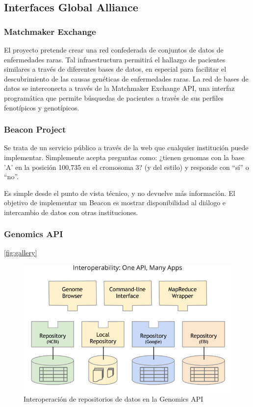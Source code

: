 \documentclass[
10pt, %
letterpaper, %
oneside, %
headinclude,footinclude, %
BCOR5mm, %
]{scrartcl}
\begin{document}
\subsection{Interfaces Global Alliance}



\subsubsection{Matchmaker Exchange}

El proyecto pretende crear una red confederada de conjuntos de datos
de enfermedades raras. Tal infraestructura permitirá el hallazgo de
pacientes similares a través de diferentes bases de datos, en especial
para facilitar el descubrimiento de las causas genéticas de
enfermedades raras. La red de bases de datos se interconecta a través
de la Matchmaker Exchange API, una interfaz programática que permite
búsquedas de pacientes a través de sus perfiles fenotípicos y
genotípicos.


\subsubsection{Beacon Project}
Se trata de un servicio público a través de la web que cualquier
institución puede implementar. Simplemente acepta preguntas como:
¿tienen genomas con la base 'A' en la posición 100,735 en el cromosoma
3? (y del estilo) y responde con ``sí'' o ``no''.

Es simple desde el punto de vista técnico, y no devuelve más
información. El objetivo de implementar un Beacon es mostrar
disponibilidad al diálogo e intercambio de datos con otras
instituciones.

\subsubsection{Genomics API}

\vref{fig:gallery}

\begin{figure}[tb]
\centering 
\includegraphics[width=0.8\columnwidth]{GA4GH_API_interop.png} 
\caption[]{Interoperación de repositorios de datos en la Genomics API}
\label{fig:interop} 
\end{figure}
\end{document}
